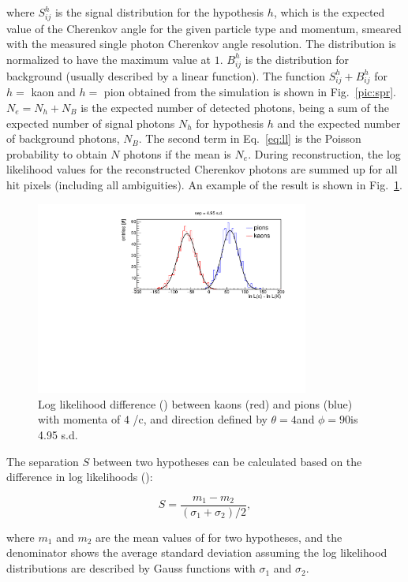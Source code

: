 \noindent where $S^{h}_{ij}$ is the signal distribution for the hypothesis $h$, which is the expected value of the Cherenkov angle for the given particle type and momentum, smeared with the measured single photon Cherenkov angle resolution. The distribution is normalized to have the maximum value at $1$. $B^{h}_{ij}$ is the distribution for background (usually described by a linear function). The function $S^{h}_{ij} + B^{h}_{ij}$ for $h = $ kaon and $h = $ pion obtained from the simulation is shown in Fig.~\ref{pic:spr}. $N_{e} = N_{h} + N_{B}$ is the expected number of detected photons, being a sum of the expected number of signal photons $N_{h}$ for hypothesis $h$ and the expected number of background photons, $N_{B}$. The second term in Eq.~\ref{eq:ll} is the Poisson probability to obtain $N$ photons if the mean is $N_{e}$.
During reconstruction, the log likelihood values for the reconstructed Cherenkov photons are summed up for all hit pixels (including all ambiguities). An example of the result is shown in Fig.~\ref{pic:sepLUT}.

\begin{figure}[!h]
\centering
\includegraphics[clip, trim=0cm 0cm 0cm 0.7cm, width=0.8\textwidth]{pics/hLnDiff.pdf}
\caption{\label{pic:sepLUT}
Log likelihood difference (\deltall) between kaons (red) and pions (blue) with momenta of $4$ {\gev}/c, and direction defined by $\theta = 4$\mydeg and $\phi = 90$\mydeg is 4.95 s.d.
}
\end{figure}

The separation $S$ between two hypotheses can be calculated based on the difference in log likelihoods (\deltall):

\begin{equation}
S = \frac{m_{1}-m_{2}}{(\sigma_{1} + \sigma_{2})/2},
\end{equation}

\noindent where $m_{1}$ and $m_{2}$ are the mean values of \deltall for two hypotheses, and the denominator shows the average standard deviation assuming the log likelihood distributions are described by Gauss functions with $\sigma_{1}$ and $\sigma_{2}$.
